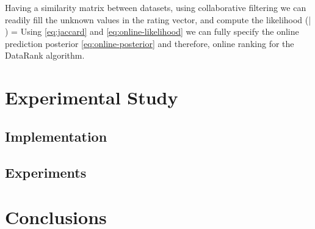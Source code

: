 \documentclass[twoside,11pt]{article}
\begin{document}
Having a similarity matrix between datasets, using collaborative filtering we can readily fill the unknown values in the rating vector, and compute the likelihood
\beq \label{eq:online-likelihood}
\pr(\bfz | \bfr) = 
\eeq
Using \eqref{eq:jaccard} and \eqref{eq:online-likelihood} we can fully specify the online prediction posterior \eqref{eq:online-posterior} and therefore, online ranking for the DataRank algorithm.

\section{Experimental Study} \label{sec:Experiments}
\subsection{Implementation}
\subsection{Experiments}
\section{Conclusions} \label{sec:conclusions}


\end{document}
